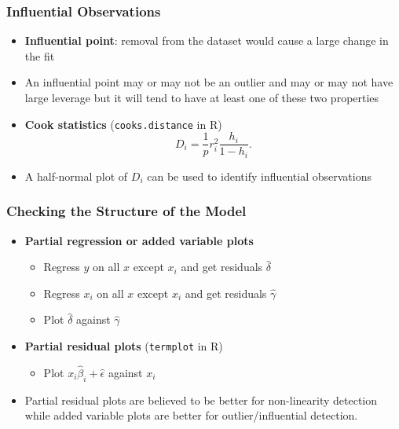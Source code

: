 \documentclass[serif,mathserif,professionalfont]{beamer}
\begin{document}
\begin{frame}
	
	\frametitle{Influential Observations}
	
	\begin{itemize}
		\item \textbf{Influential point}: removal from the dataset would cause a large change in the fit
		\item An influential point may or may not be an outlier and may or may not have large leverage but it will tend to have at least one of these two properties
		\item \textbf{Cook statistics} (\texttt{cooks.distance} in R)
		$$ D_i = \frac{1}{p} r_i^2 \frac{h_i}{1-h_i}. $$
		\item A half-normal plot of $ D_i $ can be used to identify influential observations
	\end{itemize}
	
	
\end{frame}



\begin{frame}
	
	\frametitle{Checking the Structure of the Model}
	
	\begin{itemize}
		\item \textbf{Partial regression or added variable plots}
		\begin{itemize}
			\item Regress $ y $ on all $ x $ except $ x_i $ and get residuals $ \widehat{\delta} $
			\item Regress $ x_i $ on all $ x $ except $ x_i $ and get residuals $ \widehat{\gamma} $
			\item Plot $ \widehat{\delta} $ against $ \widehat{\gamma} $
		\end{itemize}
		\item \textbf{Partial residual plots} (\texttt{termplot} in R)
		\begin{itemize}
			\item Plot $ x_i \widehat{\beta}_i + \widehat{\epsilon} $ against $ x_i $
		\end{itemize}
		\item Partial residual plots are believed to be better for non-linearity detection while added variable plots are better for outlier/influential detection.
	\end{itemize}
	
	
	
\end{frame}
\end{document}
